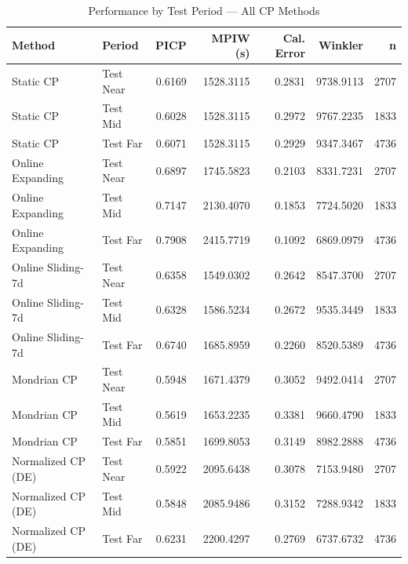 \begin{table}
\caption{Performance by Test Period — All CP Methods}
\label{tab:t5d_2_by_period}
\begin{tabular}{llrrrrr}
\toprule
Method & Period & PICP & MPIW (s) & Cal. Error & Winkler & n \\
\midrule
Static CP & Test Near & 0.6169 & 1528.3115 & 0.2831 & 9738.9113 & 2707 \\
Static CP & Test Mid & 0.6028 & 1528.3115 & 0.2972 & 9767.2235 & 1833 \\
Static CP & Test Far & 0.6071 & 1528.3115 & 0.2929 & 9347.3467 & 4736 \\
Online Expanding & Test Near & 0.6897 & 1745.5823 & 0.2103 & 8331.7231 & 2707 \\
Online Expanding & Test Mid & 0.7147 & 2130.4070 & 0.1853 & 7724.5020 & 1833 \\
Online Expanding & Test Far & 0.7908 & 2415.7719 & 0.1092 & 6869.0979 & 4736 \\
Online Sliding-7d & Test Near & 0.6358 & 1549.0302 & 0.2642 & 8547.3700 & 2707 \\
Online Sliding-7d & Test Mid & 0.6328 & 1586.5234 & 0.2672 & 9535.3449 & 1833 \\
Online Sliding-7d & Test Far & 0.6740 & 1685.8959 & 0.2260 & 8520.5389 & 4736 \\
Mondrian CP & Test Near & 0.5948 & 1671.4379 & 0.3052 & 9492.0414 & 2707 \\
Mondrian CP & Test Mid & 0.5619 & 1653.2235 & 0.3381 & 9660.4790 & 1833 \\
Mondrian CP & Test Far & 0.5851 & 1699.8053 & 0.3149 & 8982.2888 & 4736 \\
Normalized CP (DE) & Test Near & 0.5922 & 2095.6438 & 0.3078 & 7153.9480 & 2707 \\
Normalized CP (DE) & Test Mid & 0.5848 & 2085.9486 & 0.3152 & 7288.9342 & 1833 \\
Normalized CP (DE) & Test Far & 0.6231 & 2200.4297 & 0.2769 & 6737.6732 & 4736 \\
\bottomrule
\end{tabular}
\end{table}
